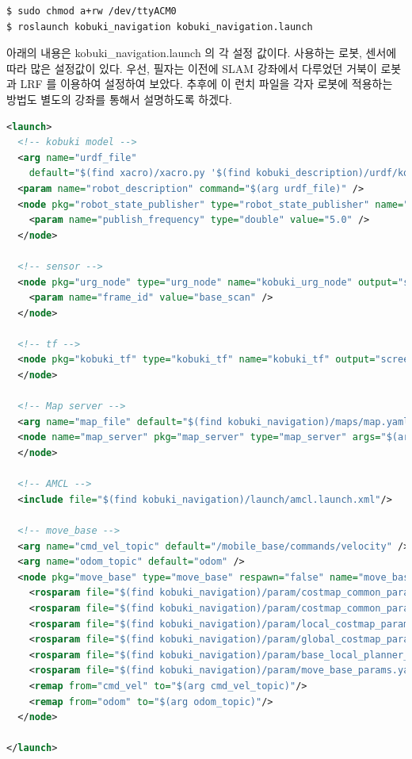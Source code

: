 \vspace{\baselineskip}
\begin{lstlisting}[language=ROS]
$ sudo chmod a+rw /dev/ttyACM0
$ roslaunch kobuki_navigation kobuki_navigation.launch
\end{lstlisting}

아래의 내용은 kobuki\_navigation.launch 의 각 설정 값이다. 사용하는 로봇, 센서에 따라 많은 설정값이 있다. 우선, 필자는 이전에 SLAM 강좌에서 다루었던 거북이 로봇과 LRF 를 이용하여 설정하여 보았다. 추후에 이 런치 파일을 각자 로봇에 적용하는 방법도 별도의 강좌를 통해서 설명하도록 하겠다.

\vspace{\baselineskip}
\begin{lstlisting}[language=XML]
<launch>
  <!-- kobuki model -->
  <arg name="urdf_file" 
    default="$(find xacro)/xacro.py '$(find kobuki_description)/urdf/kobuki_standalone.urdf.xacro'" />
  <param name="robot_description" command="$(arg urdf_file)" />
  <node pkg="robot_state_publisher" type="robot_state_publisher" name="robot_state_publisher" output="screen">
    <param name="publish_frequency" type="double" value="5.0" />
  </node>

  <!-- sensor -->
  <node pkg="urg_node" type="urg_node" name="kobuki_urg_node" output="screen">
    <param name="frame_id" value="base_scan" />
  </node>

  <!-- tf -->
  <node pkg="kobuki_tf" type="kobuki_tf" name="kobuki_tf" output="screen">
  </node>

  <!-- Map server -->
  <arg name="map_file" default="$(find kobuki_navigation)/maps/map.yaml"/>
  <node name="map_server" pkg="map_server" type="map_server" args="$(arg map_file)">
  </node>

  <!-- AMCL -->
  <include file="$(find kobuki_navigation)/launch/amcl.launch.xml"/>

  <!-- move_base -->  
  <arg name="cmd_vel_topic" default="/mobile_base/commands/velocity" />
  <arg name="odom_topic" default="odom" />
  <node pkg="move_base" type="move_base" respawn="false" name="move_base" output="screen">
    <rosparam file="$(find kobuki_navigation)/param/costmap_common_params.yaml" command="load" ns="global_costmap" />
    <rosparam file="$(find kobuki_navigation)/param/costmap_common_params.yaml" command="load" ns="local_costmap" />
    <rosparam file="$(find kobuki_navigation)/param/local_costmap_params.yaml" command="load" />
    <rosparam file="$(find kobuki_navigation)/param/global_costmap_params.yaml" command="load" />
    <rosparam file="$(find kobuki_navigation)/param/base_local_planner_params.yaml" command="load" />
    <rosparam file="$(find kobuki_navigation)/param/move_base_params.yaml" command="load" />
    <remap from="cmd_vel" to="$(arg cmd_vel_topic)"/>
    <remap from="odom" to="$(arg odom_topic)"/>
  </node>

</launch>
\end{lstlisting}

